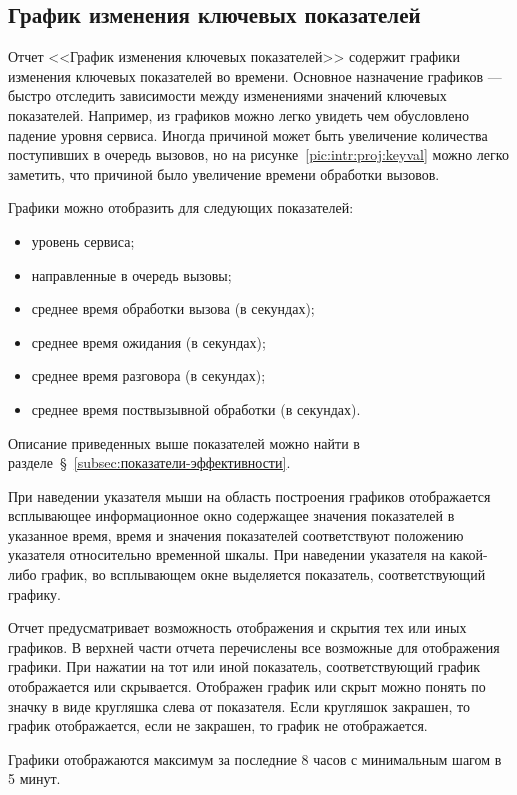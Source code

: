 \subsection{График изменения ключевых показателей}\label{subsec:график-изменения-ключевых-показателей}

Отчет <<График изменения ключевых показателей>> содержит графики изменения ключевых показателей во времени.
Основное назначение графиков --- быстро отследить зависимости между изменениями значений ключевых показателей.
Например, из графиков можно легко увидеть чем обусловлено падение уровня сервиса.
Иногда причиной может быть увеличение количества поступивших в очередь вызовов,
но на рисунке~\ref{pic:intr:proj:keyval} можно легко заметить, что причиной было увеличение времени обработки вызовов.

Графики можно отобразить для следующих показателей:
\begin{itemize}
    \item уровень сервиса;
    \item направленные в очередь вызовы;
    \item среднее время обработки вызова (в секундах);
    \item среднее время ожидания (в секундах);
    \item среднее время разговора (в секундах);
    \item среднее время поствызывной обработки (в секундах).
\end{itemize}

Описание приведенных выше показателей можно найти в разделе~\S~\ref{subsec:показатели-эффективности}.

При наведении указателя мыши на область построения графиков отображается всплывающее информационное окно содержащее значения показателей
в указанное время, время и значения показателей соответствуют положению указателя относительно временной шкалы.
При наведении указателя на какой-либо график, во всплывающем окне выделяется показатель, соответствующий графику.

Отчет предусматривает возможность отображения и скрытия тех или иных графиков.
В верхней части отчета перечислены все возможные для отображения графики.
При нажатии на тот или иной показатель, соответствующий график отображается или скрывается.
Отображен график или скрыт можно понять по значку в виде кругляшка слева от показателя.
Если кругляшок закрашен, то график отображается, если не закрашен, то график не отображается.

Графики отображаются максимум за последние 8 часов с минимальным шагом в 5 минут.

